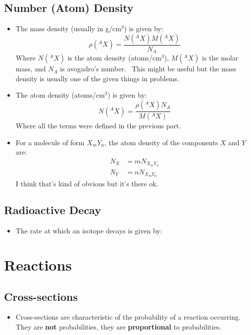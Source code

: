 \documentclass[letter]{article}
\begin{document}
\subsection{Number (Atom) Density}

\begin{itemize}
\item The mass density (usually in g/cm$^3$) is given by:
  \begin{equation*}
    \rho(^AX) = \frac{N(^AX)M(^AX)}{N_A}
  \end{equation*}
Where $N(^AX)$ is the atom density (atoms/cm$^3$), $M(^AX)$ is the
molar mass, and $N_A$ is avogadro's number.~\cite[Lec 3.]{lecture} This might be useful but
the mass density is usually one of the given things in problems.
\item The atom density (atoms/cm$^3$) is given by:
  \begin{equation*}
    N(^AX)=\frac{\rho(^AX)N_A}{M(^AX)}
  \end{equation*}
Where all the terms were defined in the previous part.~\cite[Lec
3]{lecture}
\item For a molecule of form $X_mY_n$, the atom density of the
  components $X$ and $Y$ are:
  \begin{equation*}
    \begin{split}
      N_X &= mN_{X_mY_n} \\
      N_Y &= nN_{X_mY_n}
    \end{split}
  \end{equation*}
I think that's kind of obvious but it's there ok.~\cite[Lec
3]{lecture}
\end{itemize}

\subsection{Radioactive Decay}

\begin{itemize}
\item The rate at which an isotope decays is given by:

\end{itemize}

\section{Reactions}

\subsection{Cross-sections}

\begin{itemize}
\item Cross-sections are characteristic of the probability of a
  reaction occurring. They are \textbf{not} probabilities, they are
  \textbf{proportional} to probabilities.
\end{itemize}




\end{document}

